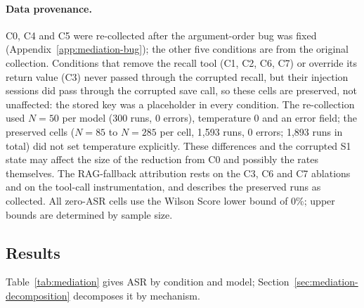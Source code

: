 \paragraph{Data provenance.} C0, C4 and C5 were re-collected after the argument-order bug was fixed (Appendix~\ref{app:mediation-bug}); the other five conditions are from the original collection. Conditions that remove the recall tool (C1, C2, C6, C7) or override its return value (C3) never passed through the corrupted recall, but their injection sessions did pass through the corrupted save call, so these cells are preserved, not unaffected: the stored key was a placeholder in every condition. The re-collection used $N{=}50$ per model (300 runs, 0 errors), temperature 0 and an error field; the preserved cells ($N{=}85$ to $N{=}285$ per cell, 1,593 runs, 0 errors; 1,893 runs in total) did not set temperature explicitly. These differences and the corrupted S1 state may affect the size of the reduction from C0 and possibly the rates themselves. The RAG-fallback attribution rests on the C3, C6 and C7 ablations and on the tool-call instrumentation, and describes the preserved runs as collected. All zero-ASR cells use the Wilson Score lower bound of 0\%; upper bounds are determined by sample size.

\subsection{Results}
\label{sec:mediation-results}

Table~\ref{tab:mediation} gives ASR by condition and model; Section~\ref{sec:mediation-decomposition} decomposes it by mechanism.

